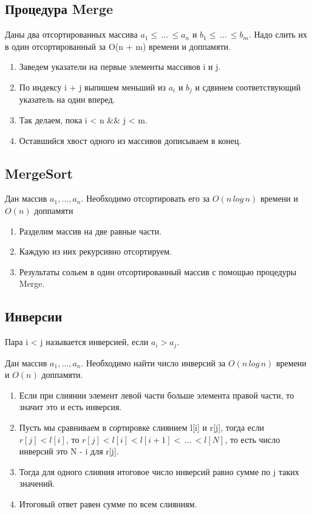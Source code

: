 \subsection*{Процедура Merge}

\Task Даны два отсортированных массива $a_1 \leq\,\dots\,\leq a_n$ и
$b_1 \leq\,\dots\,\leq b_m$. Надо слить их в один отсортированный за O(n + m)
времени и доппамяти.

\Solve 
\begin{enumerate}
    \item Заведем указатели на первые элементы массивов i и j.
    \item По индексу i + j выпишем меньший из $a_i$ и $b_j$ и сдвинем соответствующий указатель на один вперед.
    \item Так делаем, пока i < n \&\& j < m.
    \item Оставшийся хвост одного из массивов дописываем в конец.
\end{enumerate}

\subsection*{MergeSort}

\Task Дан массив $a_1, \dots , a_n$. Необходимо отсортировать его за
$O(n\,log\,n)$ времени и $O(n)$ доппамяти

\Solve
\begin{enumerate}
    \item Разделим массив на две равные части.
    \item Каждую из них рекурсивно отсортируем.
    \item Результаты сольем в один отсортированный массив с помощью процедуры Merge.
\end{enumerate}

\subsection*{Инверсии}

\Def Пара i < j называется инверсией, если $a_i > a_j$.

\Task Дан массив $a_1, \dots , a_n$. Необходимо найти число инверсий за
$O(n\,log\,n)$ времени и $O(n)$ доппамяти.

\Solve 
\begin{enumerate}
    \item Если при слиянии элемент левой части больше элемента правой части, то значит это и есть инверсия.
    \item Пусть мы сравниваем в сортировке слиянием l[i] и r[j], тогда если $r[j] < l[i]$, то $r[j] < l[i] < l[i + 1] <\, \dots \,< l[N]$, то есть число инверсий это N - i для r[j].
    \item Тогда для одного слияния итоговое число инверсий равно сумме по j таких значений.
    \item Итоговый ответ равен сумме по всем слияниям.
\end{enumerate}

\pagebreak